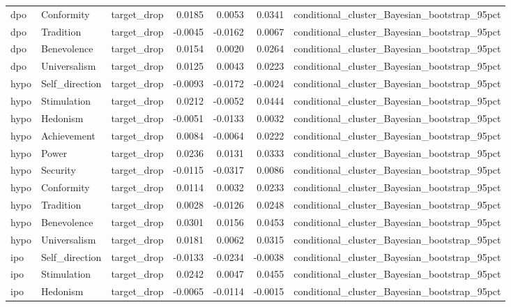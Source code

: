 \begin{tabular}{lllrrrl}
dpo & Conformity & target\_drop & 0.0185 & 0.0053 & 0.0341 & conditional\_cluster\_Bayesian\_bootstrap\_95pct \\
dpo & Tradition & target\_drop & -0.0045 & -0.0162 & 0.0067 & conditional\_cluster\_Bayesian\_bootstrap\_95pct \\
dpo & Benevolence & target\_drop & 0.0154 & 0.0020 & 0.0264 & conditional\_cluster\_Bayesian\_bootstrap\_95pct \\
dpo & Universalism & target\_drop & 0.0125 & 0.0043 & 0.0223 & conditional\_cluster\_Bayesian\_bootstrap\_95pct \\
hypo & Self\_direction & target\_drop & -0.0093 & -0.0172 & -0.0024 & conditional\_cluster\_Bayesian\_bootstrap\_95pct \\
hypo & Stimulation & target\_drop & 0.0212 & -0.0052 & 0.0444 & conditional\_cluster\_Bayesian\_bootstrap\_95pct \\
hypo & Hedonism & target\_drop & -0.0051 & -0.0133 & 0.0032 & conditional\_cluster\_Bayesian\_bootstrap\_95pct \\
hypo & Achievement & target\_drop & 0.0084 & -0.0064 & 0.0222 & conditional\_cluster\_Bayesian\_bootstrap\_95pct \\
hypo & Power & target\_drop & 0.0236 & 0.0131 & 0.0333 & conditional\_cluster\_Bayesian\_bootstrap\_95pct \\
hypo & Security & target\_drop & -0.0115 & -0.0317 & 0.0086 & conditional\_cluster\_Bayesian\_bootstrap\_95pct \\
hypo & Conformity & target\_drop & 0.0114 & 0.0032 & 0.0233 & conditional\_cluster\_Bayesian\_bootstrap\_95pct \\
hypo & Tradition & target\_drop & 0.0028 & -0.0126 & 0.0248 & conditional\_cluster\_Bayesian\_bootstrap\_95pct \\
hypo & Benevolence & target\_drop & 0.0301 & 0.0156 & 0.0453 & conditional\_cluster\_Bayesian\_bootstrap\_95pct \\
hypo & Universalism & target\_drop & 0.0181 & 0.0062 & 0.0315 & conditional\_cluster\_Bayesian\_bootstrap\_95pct \\
ipo & Self\_direction & target\_drop & -0.0133 & -0.0234 & -0.0038 & conditional\_cluster\_Bayesian\_bootstrap\_95pct \\
ipo & Stimulation & target\_drop & 0.0242 & 0.0047 & 0.0455 & conditional\_cluster\_Bayesian\_bootstrap\_95pct \\
ipo & Hedonism & target\_drop & -0.0065 & -0.0114 & -0.0015 & conditional\_cluster\_Bayesian\_bootstrap\_95pct \\

\end{tabular}
